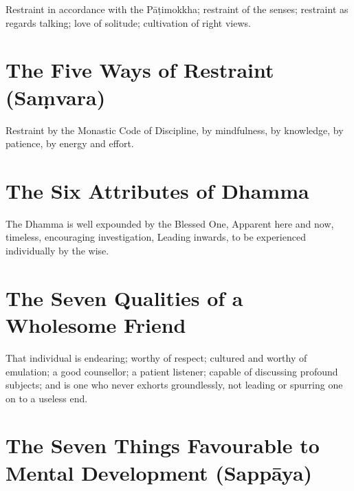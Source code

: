 Restraint in accordance with the Pāṭimokkha; restraint of the senses; restraint
as regards talking; love of solitude; cultivation of right views.


\ifhandbookedition
\vspace*{-\baselineskip}
\fi

\section*{The Five Ways of Restraint (Saṃvara)}

Restraint by the Monastic Code of Discipline, by mindfulness, by knowledge, by
patience, by energy and effort.


\ifhandbookedition
\vspace*{-\baselineskip}
\fi

\section*{The Six Attributes of Dhamma}

The Dhamma is well expounded by the Blessed One,
Apparent here and now, timeless, encouraging investigation,
Leading inwards, to be experienced individually by the wise.


\ifhandbookedition
\vspace*{-\baselineskip}
\fi

\section*{The Seven Qualities of a Wholesome Friend}


That individual is endearing; worthy of respect; cultured and worthy of
emulation; a good counsellor; a patient listener; capable of discussing profound
subjects; and is one who never exhorts groundlessly, not leading or spurring one
on to a useless end.


\ifhandbookedition
\vspace*{-\baselineskip}
\fi

\section*{The Seven Things Favourable to Mental Development (Sappāya)}

